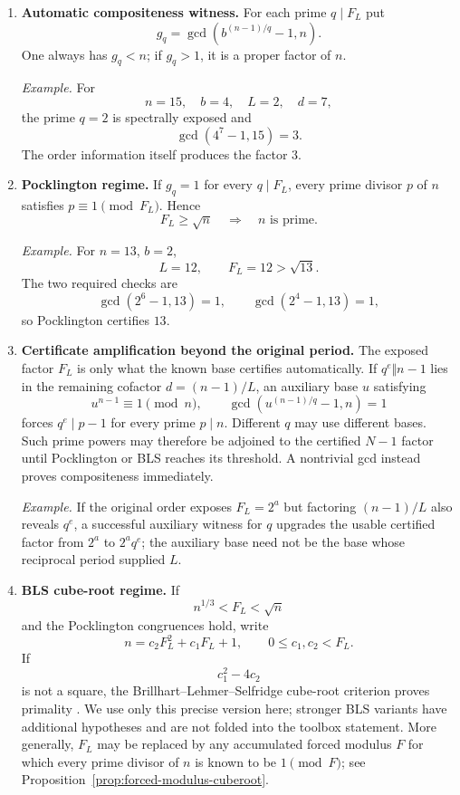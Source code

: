 \documentclass[11pt]{article}
\begin{document}
\begin{enumerate}[label=\textbf{T\arabic*.},leftmargin=2.2em,resume]
\item \textbf{Automatic compositeness witness.}
For each prime $q\mid F_L$ put
\[
g_q=\gcd\!\left(b^{(n-1)/q}-1,n\right).
\]
One always has $g_q<n$; if $g_q>1$, it is a proper factor of $n$.

\smallskip
\noindent\emph{Example.}
For
\[
n=15,\quad b=4,\quad L=2,\quad d=7,
\]
the prime $q=2$ is spectrally exposed and
\[
\gcd(4^7-1,15)=3.
\]
The order information itself produces the factor $3$.

\item \textbf{Pocklington regime.}
If $g_q=1$ for every $q\mid F_L$, every prime divisor $p$ of $n$ satisfies
$p\equiv1\pmod{F_L}$.  Hence
\[
F_L\ge\sqrt n
\quad\Longrightarrow\quad n\text{ is prime}.
\]

\smallskip
\noindent\emph{Example.}
For $n=13$, $b=2$,
\[
L=12,\qquad F_L=12>\sqrt{13}.
\]
The two required checks are
\[
\gcd(2^6-1,13)=1,\qquad
\gcd(2^4-1,13)=1,
\]
so Pocklington certifies $13$.

\item \textbf{Certificate amplification beyond the original period.}
The exposed factor $F_L$ is only what the known base certifies automatically.
If $q^e\Vert n-1$ lies in the remaining cofactor $d=(n-1)/L$, an auxiliary
base $u$ satisfying
\[
u^{n-1}\equiv1\pmod n,
\qquad
\gcd\!\left(u^{(n-1)/q}-1,n\right)=1
\]
forces $q^e\mid p-1$ for every prime $p\mid n$.  Different $q$ may use
different bases.  Such prime powers may therefore be adjoined to the
certified $N-1$ factor until Pocklington or BLS reaches its threshold.  A
nontrivial gcd instead proves compositeness immediately.

\smallskip
\noindent\emph{Example.}
If the original order exposes $F_L=2^a$ but factoring $(n-1)/L$ also reveals
$q^e$, a successful auxiliary witness for $q$ upgrades the usable certified
factor from $2^a$ to $2^a q^e$; the auxiliary base need not be the base whose
reciprocal period supplied $L$.

\item \textbf{BLS cube-root regime.}
If
\[
n^{1/3}<F_L<\sqrt n
\]
and the Pocklington congruences hold, write
\[
n=c_2F_L^2+c_1F_L+1,\qquad0\le c_1,c_2<F_L.
\]
If
\[
c_1^2-4c_2
\]
is not a square, the Brillhart--Lehmer--Selfridge cube-root criterion
proves primality \cite{BLS1975}.  We use only this precise version here;
stronger BLS variants have additional hypotheses and are not folded into the
toolbox statement.  More generally, $F_L$ may be replaced by any accumulated
forced modulus $F$ for which every prime divisor of $n$ is known to be
$1\pmod F$; see Proposition~\ref{prop:forced-modulus-cuberoot}.


\end{enumerate}
\end{document}

